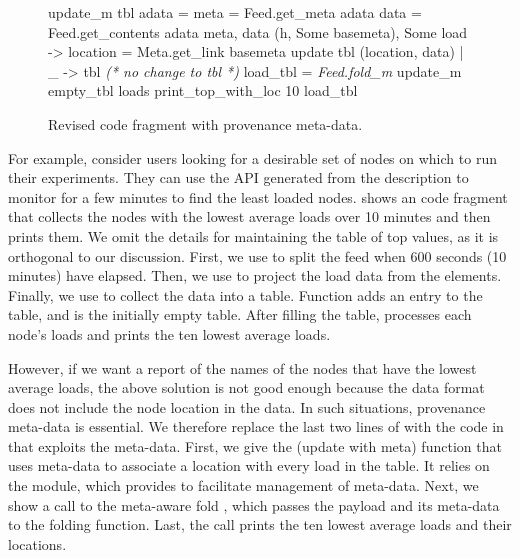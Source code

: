 \begin{figure}[t]

\begin{codebox}
 update_m  tbl adata =
   meta = Feed.get_meta adata 
   data = Feed.get_contents adata 
   meta, data  
    (h, Some basemeta), Some load ->
       location = Meta.get_link basemeta 
      update tbl (location, data)
  | _ -> tbl \textit{ (* no change to tbl *)} 
 load_tbl = \textit{Feed.fold_m} update_m empty_tbl loads
 print_top_with_loc 10 load_tbl
\end{codebox}
  \caption{Revised code fragment with provenance meta-data. }
\label{fig:sample-loads-prov}\shrink
\end{figure}

For example, consider \planetlab users looking for a desirable set of
nodes on which to run their experiments. 
They can use the API generated from the \comon description 
to monitor \planetlab for a few
minutes to find the least loaded nodes. 
shows an \ocaml{} code fragment that collects the nodes with the
lowest average loads over 10 minutes and then prints them. 
We omit the details for maintaining the table of top values, as it is
orthogonal to our discussion. 
First, we use  to
split the feed when 600 seconds (10 minutes) have elapsed. Then, we
use  to project the load data from the \comon
elements. Finally, we use  to collect the data
into a table. Function  adds an entry to the table, and
 is the initially empty table.
After filling the table, 
processes each node's loads
and prints the ten lowest average loads.

However, if we want a report of the names of the nodes that have 
the lowest average loads, the above solution is not good enough
because the \comon data format does not include the node location in the data.
In such situations, provenance meta-data is essential. 
We therefore replace the last two lines of
 with the code in
 that exploits the meta-data. First, we
give the
 (update with meta) function that uses
meta-data to associate a location with every load in the table. It relies on the  module, 
which \padsd{} provides to facilitate management of meta-data. Next, 
we show a call to the meta-aware fold , which passes the 
payload and its meta-data to the folding
function.  Last, the call  prints the ten 
lowest average loads and their locations.

